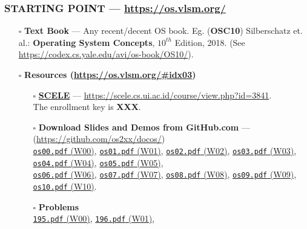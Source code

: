 \begin{frame}[fragile]
\frametitle{\textbf{STARTING POINT} --- 
{
\hypersetup{colorlinks,linkcolor=,urlcolor=links}
\url{https://os.vlsm.org/}
}
}
\begin{itemize}
\item[$\square$] \textbf{Text Book} ---
                 Any recent/decent OS book. Eg. (\textbf{OSC10}) Silberschatz et. al.: 
                 \textbf{Operating System Concepts}, $10^{th}$ Edition, 2018.
                 (See \url{https://codex.cs.yale.edu/avi/os-book/OS10/}).
\item[$\square$] \textbf{Resources ({\footnotesize \url{https://os.vlsm.org/\#idx03}})}
\begin{itemize}
\item[$\square$] \href{https://scele.cs.ui.ac.id/course/view.php?id=3841}{\textbf{SCELE}} ---
\url{https://scele.cs.ui.ac.id/course/view.php?id=3841}.\\
The enrollment key is \textbf{XXX}.
\item[$\square$] \textbf{Download Slides and Demos from GitHub.com} --- (\url{https://github.com/os2xx/docos/})\\
                 {\scriptsize%
                 \href{https://docos.vlsm.org/Slides/os00.pdf}{\texttt{os00.pdf} (W00)},
                 \href{https://docos.vlsm.org/Slides/os01.pdf}{\texttt{os01.pdf} (W01)},
                 \href{https://docos.vlsm.org/Slides/os02.pdf}{\texttt{os02.pdf} (W02)},
                 \href{https://docos.vlsm.org/Slides/os03.pdf}{\texttt{os03.pdf} (W03)},
                 \href{https://docos.vlsm.org/Slides/os04.pdf}{\texttt{os04.pdf} (W04)},
                 \href{https://docos.vlsm.org/Slides/os05.pdf}{\texttt{os05.pdf} (W05)},\\
                 \href{https://docos.vlsm.org/Slides/os06.pdf}{\texttt{os06.pdf} (W06)},
                 \href{https://docos.vlsm.org/Slides/os07.pdf}{\texttt{os07.pdf} (W07)},
                 \href{https://docos.vlsm.org/Slides/os08.pdf}{\texttt{os08.pdf} (W08)},
                 \href{https://docos.vlsm.org/Slides/os09.pdf}{\texttt{os09.pdf} (W09)},
                 \href{https://docos.vlsm.org/Slides/os10.pdf}{\texttt{os10.pdf} (W10)}.
                 }
\item[$\square$] \textbf{Problems}\\
                 {\scriptsize%
                 \href{https://rms46.vlsm.org/2/195.pdf}{\texttt{195.pdf} (W00)},
                 \href{https://rms46.vlsm.org/2/196.pdf}{\texttt{196.pdf} (W01)},
}
\end{itemize}
\end{itemize}
\end{frame}
